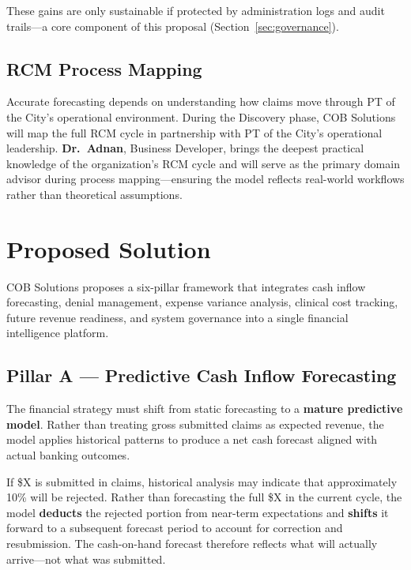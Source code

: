 \documentclass[11pt,a4paper]{article}
\begin{document}
These gains are only sustainable if protected by administration logs and audit trails---a
core component of this proposal (Section~\ref{sec:governance}).

\subsection{RCM Process Mapping}

Accurate forecasting depends on understanding how claims move through PT of the City's
operational environment. During the Discovery phase, COB Solutions will map the full RCM
cycle in partnership with PT of the City's operational leadership. \textbf{Dr.\ Adnan},
Business Developer, brings the deepest practical knowledge of the organization's RCM cycle
and will serve as the primary domain advisor during process mapping---ensuring the model
reflects real-world workflows rather than theoretical assumptions.


\section{Proposed Solution}

COB Solutions proposes a six-pillar framework that integrates cash inflow forecasting,
denial management, expense variance analysis, clinical cost tracking, future revenue
readiness, and system governance into a single financial intelligence platform.

\subsection{Pillar A --- Predictive Cash Inflow Forecasting}

The financial strategy must shift from static forecasting to a \textbf{mature predictive
model}. Rather than treating gross submitted claims as expected revenue, the model applies
historical patterns to produce a net cash forecast aligned with actual banking outcomes.

\begin{tcolorbox}[infobox,title={How the Mature Model Works}]
If \$X is submitted in claims, historical analysis may indicate that approximately
10\% will be rejected. Rather than forecasting the full \$X in the current cycle, the
model \textbf{deducts} the rejected portion from near-term expectations and \textbf{shifts}
it forward to a subsequent forecast period to account for correction and resubmission. The cash-on-hand
forecast therefore reflects what will actually arrive---not what was submitted.
\end{tcolorbox}
\end{document}
